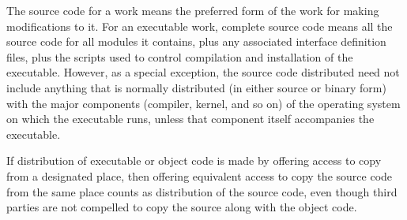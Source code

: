 The source code for a work means the preferred form of the work for making modifications to it. For an executable work, complete source code means all the source code for all modules it contains, plus any associated interface definition files, plus the scripts used to control compilation and installation of the executable. However, as a special exception, the source code distributed need not include anything that is normally distributed (in either source or binary form) with the major components (compiler, kernel, and so on) of the operating system on which the executable runs, unless that component itself accompanies the executable.

If distribution of executable or object code is made by offering access to copy from a designated place, then offering equivalent access to copy the source code from the same place counts as distribution of the source code, even though third parties are not compelled to copy the source along with the object code.



